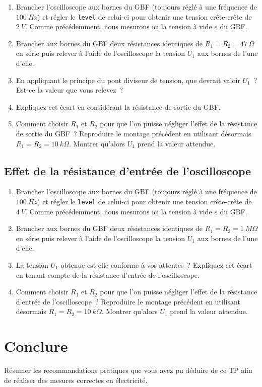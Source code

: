 \documentclass[a4paper, 11pt, final, garamond]{book}
\begin{document}
\begin{enumerate}
    \item Brancher l'oscilloscope aux bornes du GBF (toujours réglé à une
        fréquence de $\SI{100}{Hz}$) et régler le \texttt{level} de celui-ci
        pour obtenir une tension crête-crête de $\SI{2}{V}$. Comme précédemment,
        nous mesurons ici la tension à vide $e$ du GBF.
    \item Brancher aux bornes du GBF deux résistances identiques de $R_1 = R_2 =
        \SI{47}{\Omega}$ en série puis relever à l'aide de l'oscilloscope la
        tension $U_1$ aux bornes de l'une d'elle.
    \item En appliquant le principe du pont diviseur de tension, que devrait
        valoir $U_1$~? Est-ce la valeur que vous relevez~?
    \item Expliquez cet écart en considérant la résistance de sortie du GBF.
    \item Comment choisir $R_1$ et $R_2$ pour que l'on puisse négliger l'effet
        de la résistance de sortie du GBF~? Reproduire le montage précédent en
        utilisant désormais $R_1 = R_2 = \SI{10}{k\Omega}$. Montrer qu'alors
        $U_1$ prend la valeur attendue.
\end{enumerate}

\subsection{Effet de la résistance d'entrée de l'oscilloscope}

\begin{enumerate}
    \item Brancher l'oscilloscope aux bornes du GBF (toujours réglé à une
        fréquence de $\SI{100}{Hz}$) et régler le \texttt{level} de celui-ci
        pour obtenir une tension crête-crête de $\SI{4}{V}$. Comme précédemment,
        nous mesurons ici la tension à vide $e$ du GBF.
    \item Brancher aux bornes du GBF deux résistances identiques de $R_1 = R_2 =
        \SI{1}{M\Omega}$ en série puis relever à l'aide de l'oscilloscope la
        tension $U_1$ aux bornes de l'une d'elle.
    \item La tension $U_1$ obtenue est-elle conforme à vos attentes~? Expliquez
        cet écart en tenant compte de la résistance d'entrée de l'oscilloscope.
    \item Comment choisir $R_1$ et $R_2$ pour que l'on puisse négliger l'effet
        de la résistance d'entrée de l'oscilloscope~? Reproduire le montage
        précédent en utilisant désormais $R_1 = R_2 = \SI{10}{k\Omega}$. Montrer
        qu'alors $U_1$ prend la valeur attendue.
\end{enumerate}

\section{Conclure}

Résumer les recommandations pratiques que vous avez pu déduire de ce TP afin de
réaliser des mesures correctes en électricité.
\end{document}
